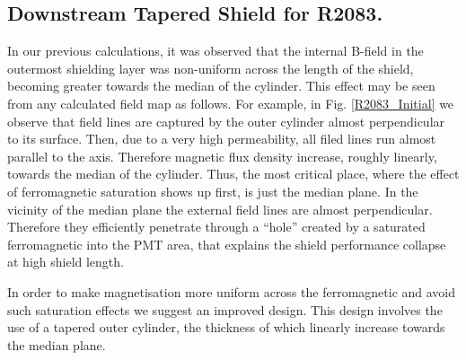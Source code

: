 \documentclass[12pt]{article}
\begin{document}
\subsection{Downstream Tapered  Shield for R2083.}
In our previous calculations, it was observed that the 
internal B-field  in the outermost shielding layer was 
non-uniform across the length of the shield, becoming greater
towards the median of the cylinder.
This effect may be seen from any calculated field map as follows.
For example, in Fig. \ref{R2083_Initial}
we observe that field lines are captured  by the outer cylinder almost perpendicular
to its surface. Then, due to a very high permeability, all filed lines
run  almost parallel to the axis. Therefore  magnetic flux density 
increase, roughly linearly, towards the median of the cylinder. 
Thus, the  most critical  place, where the  effect of  ferromagnetic saturation 
shows up first, is just  the median plane.  In the vicinity of the  median plane 
the external field lines are almost perpendicular. 
Therefore they efficiently penetrate through a ``hole'' created by a 
saturated ferromagnetic into the PMT area, that explains the shield performance
collapse at high shield length. 

In order to make magnetisation more uniform across the ferromagnetic and avoid such saturation effects
we suggest an improved  design. This design  involves the use of a tapered outer cylinder,
the  thickness of which  linearly increase  towards the median plane.
\end{document}
